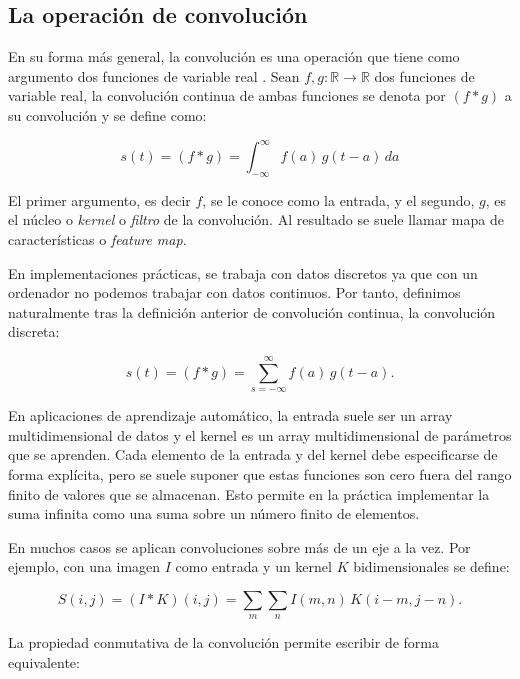\subsection{La operación de convolución} \label{subsec:op-convolucion} 

En su forma más general, la convolución es una operación que tiene como argumento dos funciones de variable real \parencite{Goodfellow-et-al-2016}. Sean $f, g : \mathbb{R} \rightarrow \mathbb{R}$ dos funciones de variable real, la convolución continua de ambas funciones se denota por $(f * g)$ a su convolución y se define como:

\begin{equation}
s(t) = (f * g) = \int_{-\infty}^{\infty} f(a) \, g(t - a) \, da
\end{equation}

El primer argumento, es decir $f$, se le conoce como la entrada, y el segundo, $g$, es el núcleo o \textit{kernel} o \textit{filtro} de la convolución. Al resultado se suele llamar mapa de características o \textit{feature map}.

En implementaciones prácticas, se trabaja con datos discretos ya que con un ordenador no podemos trabajar con datos continuos. Por tanto, definimos naturalmente tras la definición anterior de convolución continua, la convolución discreta:

\begin{equation}
s(t) = (f * g) = \sum_{s=-\infty}^{\infty} f(a) \, g(t - a).
\end{equation}

En aplicaciones de aprendizaje automático, la entrada suele ser un array multidimensional de datos y el kernel es un array multidimensional de parámetros que se aprenden. Cada elemento de la entrada y del kernel debe especificarse de forma explícita, pero se suele suponer que estas funciones son cero fuera del rango finito de valores que se almacenan. Esto permite en la práctica implementar la suma infinita como una suma sobre un número finito de elementos.

En muchos casos se aplican convoluciones sobre más de un eje a la vez. Por ejemplo, con una imagen $I$ como entrada y un kernel $K$ bidimensionales se define:

\begin{equation}
S(i,j) = (I * K)(i,j) = \sum_m \sum_n I(m,n) \, K(i - m, j - n).
\end{equation}

La propiedad conmutativa de la convolución permite escribir de forma equivalente:

